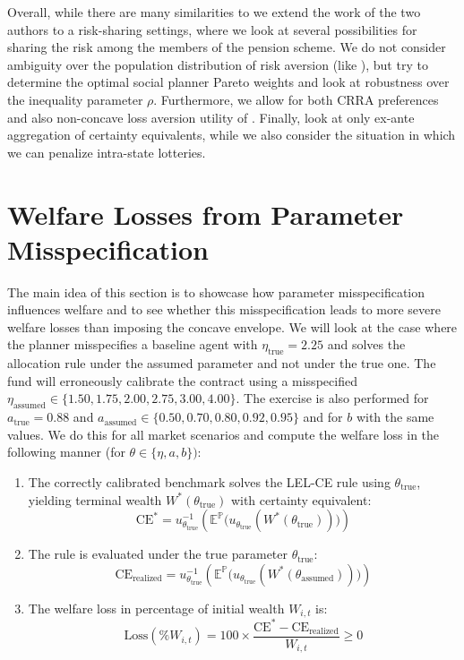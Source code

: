\documentclass[11pt,a4paper]{article}
\theoremstyle{definition}
\theoremstyle{plain}
\theoremstyle{remark}
\newcommand{\E}{\mathbb{E}}
\renewcommand{\P}{\mathbb{P}}
\newcommand{\1}{\mathbf{1}}
\begin{document}
Overall, while there are many similarities to \citet{BalterSchweizer2024} we extend the work of the two authors to a risk-sharing settings, where we look at several possibilities for sharing the risk among the members of the pension scheme. We do not consider ambiguity over the population distribution of risk aversion (like \citet{BalterSchweizer2024}), but try to determine the optimal social planner Pareto weights and look at robustness over the inequality parameter $\rho$. Furthermore, we allow for both CRRA preferences and also non-concave loss aversion utility of \citet{KahnemanTversky1979}. Finally, \citet{BalterSchweizer2024} look at only ex-ante aggregation of certainty equivalents, while we also consider the situation in which we can penalize intra-state lotteries.

\section{Welfare Losses from Parameter Misspecification}
The main idea of this section is to showcase how parameter misspecification influences welfare and to see whether this misspecification leads to more severe welfare losses than imposing the concave envelope. We will look at the case where the planner misspecifies a baseline agent with $\eta_{\text{true}} = 2.25$ \citep{KahnemanTversky1992} and solves the allocation rule under the assumed parameter and not under the true one. The fund will erroneously calibrate the contract using a misspecified $\eta_{\text{assumed}} \in \{1.50, 1.75, 2.00, 2.75, 3.00, 4.00\}$. The exercise is also performed for $a_{\text{true}} = 0.88$ and $a_{\text{assumed}} \in \{0.50, 0.70, 0.80, 0.92, 0.95\}$ and for $b$ with the same values. We do this for all market scenarios and compute the welfare loss in the following manner (for $\theta \in \{\eta, a, b\})$:
\begin{enumerate}
    \item The correctly calibrated benchmark solves the LEL-CE rule using $\theta_{\text{true}}$, yielding terminal wealth $W^*(\theta_{\text{true}})$ with certainty equivalent:
    \begin{equation*}
        \text{CE}^* = u_{\theta_{\text{true}}}^{-1}\left( \E^\P\big( u_{\theta_{\text{true}}}(W^*(\theta_{\text{true}})) \big) \right)
    \end{equation*}
    \item The rule is evaluated under the true parameter $\theta_{\text{true}}$:
    \begin{equation*}
        \text{CE}_{\text{realized}} = u_{\theta_{\text{true}}}^{-1}\left( \E^\P\big( u_{\theta_{\text{true}}}(W^*(\theta_{\text{assumed}})) \big)\right)
    \end{equation*}
    \item The welfare loss in percentage of initial wealth $W_{i,t}$ is:
    \begin{equation*}
        \text{Loss}(\%W_{i,t}) = 100 \times \frac{\text{CE}^* - \text{CE}_{\text{realized}}}{W_{i,t}} \geq 0
    \end{equation*}
\end{enumerate}
\end{document}
